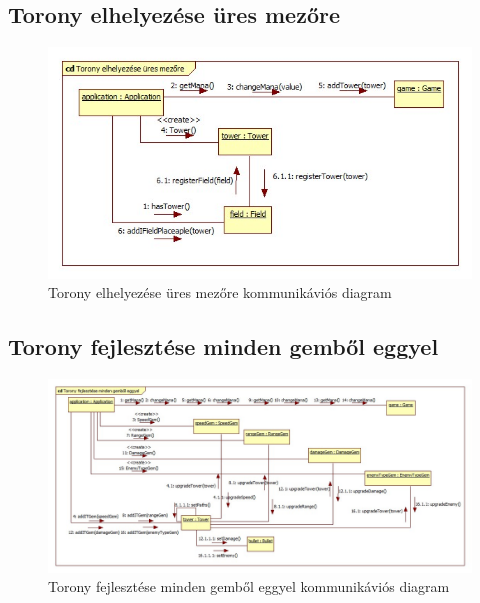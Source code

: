 \subsection{Torony elhelyezése üres mezőre}
\begin{figure}[H]
\begin{center}
\includegraphics[width=17cm]{chapters/chapter05/images/cd_Torony_elhelyezese_ures_mezore.jpg}
\caption{Torony elhelyezése üres mezőre kommunikáviós diagram}
\label{fig:cd_Torony_elhelyezese_ures_mezore}
\end{center}
\end{figure}

\subsection{Torony fejlesztése minden gemből eggyel}
\begin{figure}[H]
\begin{center}
\includegraphics[width=17cm]{chapters/chapter05/images/cd_Torony_fejlesztese_minden_gembol_eggyel.jpg}
\caption{Torony fejlesztése minden gemből eggyel kommunikáviós diagram}
\label{fig:cd_Torony_fejlesztese_minden_gembol_eggyel}
\end{center}
\end{figure}

